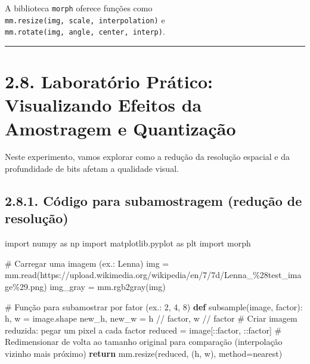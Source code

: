 \documentclass[
  portuguese,
  letterpaper,
  openany,
  oneside,
  12pt,
  a4paper]{book}
\newenvironment{Shaded}{\begin{snugshade}}{\end{snugshade}}
\newcommand{\CommentTok}[1]{\textcolor[rgb]{0.37,0.37,0.37}{#1}}
\newcommand{\ControlFlowTok}[1]{\textcolor[rgb]{0.00,0.23,0.31}{\textbf{#1}}}
\newcommand{\ImportTok}[1]{\textcolor[rgb]{0.00,0.46,0.62}{#1}}
\newcommand{\KeywordTok}[1]{\textcolor[rgb]{0.00,0.23,0.31}{\textbf{#1}}}
\newcommand{\NormalTok}[1]{\textcolor[rgb]{0.00,0.23,0.31}{#1}}
\newcommand{\OperatorTok}[1]{\textcolor[rgb]{0.37,0.37,0.37}{#1}}
\newcommand{\StringTok}[1]{\textcolor[rgb]{0.13,0.47,0.30}{#1}}
\begin{document}
\begin{tcolorbox}
A biblioteca \texttt{morph} oferece funções como
\texttt{mm.resize(img,\ scale,\ interpolation)} e
\texttt{mm.rotate(img,\ angle,\ center,\ interp)}.

\begin{center}\rule{0.5\linewidth}{0.5pt}\end{center}

\section{2.8. Laboratório Prático: Visualizando Efeitos da Amostragem e
Quantização}\label{laboratuxf3rio-pruxe1tico-visualizando-efeitos-da-amostragem-e-quantizauxe7uxe3o}

Neste experimento, vamos explorar como a redução da resolução espacial e
da profundidade de bits afetam a qualidade visual.

\subsection{2.8.1. Código para subamostragem (redução de
resolução)}\label{cuxf3digo-para-subamostragem-reduuxe7uxe3o-de-resoluuxe7uxe3o}

\begin{Shaded}
\begin{Highlighting}[]
\ImportTok{import}\NormalTok{ numpy }\ImportTok{as}\NormalTok{ np}
\ImportTok{import}\NormalTok{ matplotlib.pyplot }\ImportTok{as}\NormalTok{ plt}
\ImportTok{import}\NormalTok{ morph}

\CommentTok{\# Carregar uma imagem (ex.: Lenna)}
\NormalTok{img }\OperatorTok{=}\NormalTok{ mm.read(}\StringTok{\textquotesingle{}https://upload.wikimedia.org/wikipedia/en/7/7d/Lenna\_\%28test\_image\%29.png\textquotesingle{}}\NormalTok{)}
\NormalTok{img\_gray }\OperatorTok{=}\NormalTok{ mm.rgb2gray(img)}

\CommentTok{\# Função para subamostrar por fator (ex.: 2, 4, 8)}
\KeywordTok{def}\NormalTok{ subsample(image, factor):}
\NormalTok{    h, w }\OperatorTok{=}\NormalTok{ image.shape}
\NormalTok{    new\_h, new\_w }\OperatorTok{=}\NormalTok{ h }\OperatorTok{//}\NormalTok{ factor, w }\OperatorTok{//}\NormalTok{ factor}
    \CommentTok{\# Criar imagem reduzida: pegar um pixel a cada \textquotesingle{}factor\textquotesingle{}}
\NormalTok{    reduced }\OperatorTok{=}\NormalTok{ image[::factor, ::factor]}
    \CommentTok{\# Redimensionar de volta ao tamanho original para comparação (interpolação vizinho mais próximo)}
    \ControlFlowTok{return}\NormalTok{ mm.resize(reduced, (h, w), method}\OperatorTok{=}\StringTok{\textquotesingle{}nearest\textquotesingle{}}\NormalTok{)}


\end{Highlighting}
\end{Shaded}
\end{tcolorbox}
\end{document}
